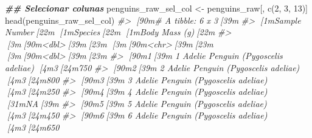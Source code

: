 \documentclass[
]{book}
\newenvironment{Shaded}{\begin{snugshade}}{\end{snugshade}}
\newcommand{\CommentTok}[1]{\textcolor[rgb]{0.37,0.37,0.37}{\textit{#1}}}
\newcommand{\DecValTok}[1]{\textcolor[rgb]{0.06,0.06,0.06}{#1}}
\newcommand{\DocumentationTok}[1]{\textcolor[rgb]{0.37,0.37,0.37}{\textbf{\textit{#1}}}}
\newcommand{\FunctionTok}[1]{\textcolor[rgb]{0,0,0}{#1}}
\newcommand{\NormalTok}[1]{#1}
\newcommand{\OtherTok}[1]{\textcolor[rgb]{0.37,0.37,0.37}{#1}}
\begin{document}
\begin{Shaded}
\begin{Highlighting}[]
\DocumentationTok{\#\# Selecionar colunas}
\NormalTok{penguins\_raw\_sel\_col }\OtherTok{\textless{}{-}}\NormalTok{ penguins\_raw[, }\FunctionTok{c}\NormalTok{(}\DecValTok{2}\NormalTok{, }\DecValTok{3}\NormalTok{, }\DecValTok{13}\NormalTok{)]}
\FunctionTok{head}\NormalTok{(penguins\_raw\_sel\_col)}
\CommentTok{\#\textgreater{} [90m\# A tibble: 6 x 3[39m}
\CommentTok{\#\textgreater{}   [1m\textasciigrave{}Sample Number\textasciigrave{}[22m [1mSpecies[22m                             [1m\textasciigrave{}Body Mass (g)\textasciigrave{}[22m}
\CommentTok{\#\textgreater{}             [3m[90m\textless{}dbl\textgreater{}[39m[23m [3m[90m\textless{}chr\textgreater{}[39m[23m                                         [3m[90m\textless{}dbl\textgreater{}[39m[23m}
\CommentTok{\#\textgreater{} [90m1[39m               1 Adelie Penguin (Pygoscelis adeliae)            [4m3[24m750}
\CommentTok{\#\textgreater{} [90m2[39m               2 Adelie Penguin (Pygoscelis adeliae)            [4m3[24m800}
\CommentTok{\#\textgreater{} [90m3[39m               3 Adelie Penguin (Pygoscelis adeliae)            [4m3[24m250}
\CommentTok{\#\textgreater{} [90m4[39m               4 Adelie Penguin (Pygoscelis adeliae)              [31mNA[39m}
\CommentTok{\#\textgreater{} [90m5[39m               5 Adelie Penguin (Pygoscelis adeliae)            [4m3[24m450}
\CommentTok{\#\textgreater{} [90m6[39m               6 Adelie Penguin (Pygoscelis adeliae)            [4m3[24m650}


\end{Highlighting}
\end{Shaded}
\end{document}
